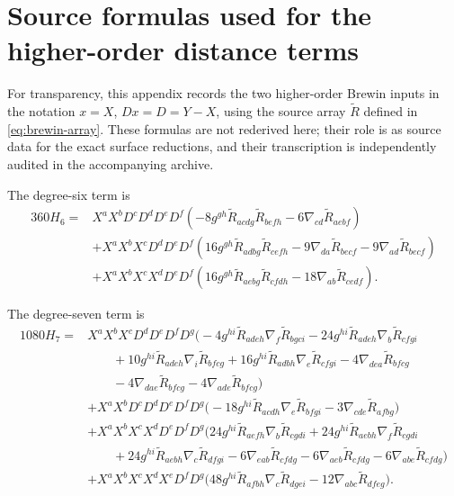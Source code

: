 \documentclass[11pt]{amsart}
\numberwithin{equation}{section}
\theoremstyle{remark}
\newcommand{\BRiem}{\widetilde{R}}
\begin{document}
\appendix

\section{Source formulas used for the higher-order distance terms}\label{app:source}
For transparency, this appendix records the two higher-order Brewin inputs in the notation $x=X$, $Dx=D=Y-X$, using the source array $\BRiem$ defined in \eqref{eq:brewin-array}.  These formulas are not rederived here; their role is as source data for the exact surface reductions, and their transcription is independently audited in the accompanying archive.

The degree-six term is
\begin{align*}
360H_6={}&X^aX^bD^cD^dD^eD^f
\left(-8g^{gh}\BRiem_{acdg}\BRiem_{befh}-6\nabla_{cd}\BRiem_{aebf}\right)\\
&+X^aX^bX^cD^dD^eD^f
\left(16g^{gh}\BRiem_{adbg}\BRiem_{cefh}-9\nabla_{da}\BRiem_{becf}-9\nabla_{ad}\BRiem_{becf}\right)\\
&+X^aX^bX^cX^dD^eD^f
\left(16g^{gh}\BRiem_{aebg}\BRiem_{cfdh}-18\nabla_{ab}\BRiem_{cedf}\right).
\end{align*}

The degree-seven term is
\begin{align*}
1080H_7={}&X^aX^bX^cD^dD^eD^fD^g
\bigl(-4g^{hi}\BRiem_{adeh}\nabla_f\BRiem_{bgci}
-24g^{hi}\BRiem_{adeh}\nabla_b\BRiem_{cfgi}\\
&\qquad+10g^{hi}\BRiem_{adeh}\nabla_i\BRiem_{bfcg}
+16g^{hi}\BRiem_{adbh}\nabla_e\BRiem_{cfgi}
-4\nabla_{dea}\BRiem_{bfcg}\\
&\qquad-4\nabla_{dae}\BRiem_{bfcg}-4\nabla_{ade}\BRiem_{bfcg}\bigr)\\
&+X^aX^bD^cD^dD^eD^fD^g
\bigl(-18g^{hi}\BRiem_{acdh}\nabla_e\BRiem_{bfgi}-3\nabla_{cde}\BRiem_{afbg}\bigr)\\
&+X^aX^bX^cX^dD^eD^fD^g
\bigl(24g^{hi}\BRiem_{aefh}\nabla_b\BRiem_{cgdi}
+24g^{hi}\BRiem_{aebh}\nabla_f\BRiem_{cgdi}\\
&\qquad+24g^{hi}\BRiem_{aebh}\nabla_c\BRiem_{dfgi}
-6\nabla_{eab}\BRiem_{cfdg}-6\nabla_{aeb}\BRiem_{cfdg}-6\nabla_{abe}\BRiem_{cfdg}\bigr)\\
&+X^aX^bX^cX^dX^eD^fD^g
\bigl(48g^{hi}\BRiem_{afbh}\nabla_c\BRiem_{dgei}-12\nabla_{abc}\BRiem_{dfeg}\bigr).
\end{align*}
\end{document}
